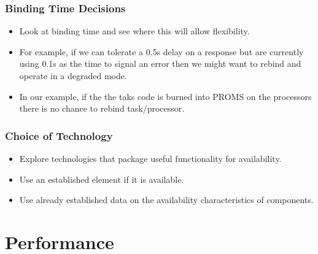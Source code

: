 \documentclass[a4paper]{report}
\begin{document}
\subsection{Binding Time Decisions}
\begin{itemize}
\item{Look at binding time and see where this will allow flexibility.}
\item{For example, if we can tolerate a 0.5s delay on a response but are currently using 0.1s as the time to signal an error then we might want to rebind and operate in a degraded mode.}
\item{In our example, if the the taks code is burned into PROMS on the processors there is no chance to rebind task/processor.}
\end{itemize}
\subsection{Choice of Technology}
\begin{itemize}
\item{Explore technologies that package useful functionality for availability.}
\item{Use an established element if it is available.}
\item{Use already established data on the availability characteristics of components.}
\end{itemize}

\chapter{Performance}
\end{document}
